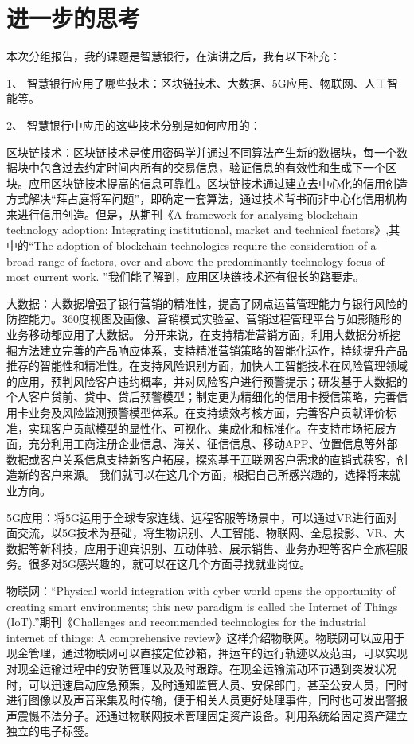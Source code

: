 \documentclass{article}
\begin{document}
\section{进一步的思考}
本次分组报告，我的课题是智慧银行，在演讲之后，我有以下补充：\par
1、	智慧银行应用了哪些技术：区块链技术、大数据、5G应用、物联网、人工智能等。\par
2、	智慧银行中应用的这些技术分别是如何应用的：\par
区块链技术：区块链技术是使用密码学并通过不同算法产生新的数据块，每一个数据块中包含过去约定时间内所有的交易信息，验证信息的有效性和生成下一个区块。应用区块链技术提高的信息可靠性。区块链技术通过建立去中心化的信用创造方式解决“拜占庭将军问题”，即确定一套算法，通过技术背书而非中心化信用机构来进行信用创造。但是，从期刊《A framework for analysing blockchain technology adoption: Integrating institutional, market and technical factors》\citep{qukuailian},其中的“The adoption of blockchain technologies require the consideration of a broad range of factors, over and above the predominantly technology focus of most current work. ”我们能了解到，应用区块链技术还有很长的路要走。\par
大数据：大数据增强了银行营销的精准性，提高了网点运营管理能力与银行风险的防控能力。360度视图及画像、营销模式实验室、营销过程管理平台与如影随形的业务移动都应用了大数据。
分开来说，在支持精准营销方面，利用大数据分析挖掘方法建立完善的产品响应体系，支持精准营销策略的智能化运作，持续提升产品推荐的智能性和精准性。在支持风险识别方面，加快人工智能技术在风险管理领域的应用，预判风险客户违约概率，并对风险客户进行预警提示；研发基于大数据的个人客户贷前、贷中、贷后预警模型；制定更为精细化的信用卡授信策略，完善信用卡业务及风险监测预警模型体系。在支持绩效考核方面，完善客户贡献评价标准，实现客户贡献模型的显性化、可视化、集成化和标准化。在支持市场拓展方面，充分利用工商注册企业信息、海关、征信信息、移动APP、位置信息等外部数据或客户关系信息支持新客户拓展，探索基于互联网客户需求的直销式获客，创造新的客户来源。
我们就可以在这几个方面，根据自己所感兴趣的，选择将来就业方向。\par
5G应用：将5G运用于全球专家连线、远程客服等场景中，可以通过VR进行面对面交流，以5G技术为基础，将生物识别、人工智能、物联网、全息投影、VR、大数据等新科技，应用于迎宾识别、互动体验、展示销售、业务办理等客户全旅程服务。很多对5G感兴趣的，就可以在这几个方面寻找就业岗位。\par
物联网：“Physical world integration with cyber world opens the opportunity of creating smart environments; this new paradigm is called the Internet of Things (IoT).”期刊《Challenges and recommended technologies for the industrial internet of things: A comprehensive review》\citep{wulianwang}这样介绍物联网。物联网可以应用于现金管理，通过物联网可以直接定位钞箱，押运车的运行轨迹以及范围，可以实现对现金运输过程中的安防管理以及及时跟踪。在现金运输流动环节遇到突发状况时，可以迅速启动应急预案，及时通知监管人员、安保部门，甚至公安人员，同时进行图像以及声音采集及时传输，便于相关人员更好处理事件，同时也可发出警报声震慑不法分子。还通过物联网技术管理固定资产设备。利用系统给固定资产建立独立的电子标签。\par
\end{document}
